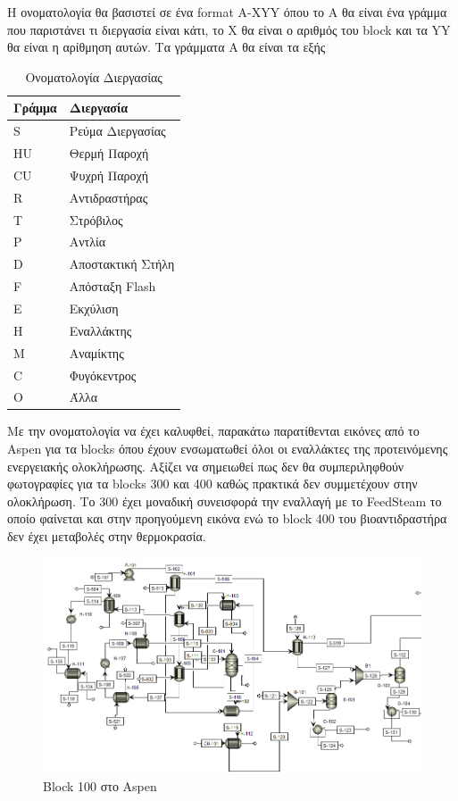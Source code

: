 \documentclass[11pt]{article}
\begin{document}
Η ονοματολογία θα βασιστεί σε ένα format A-XYY όπου το A θα είναι ένα γράμμα που παριστάνει τι διεργασία είναι κάτι, το X θα είναι ο αριθμός του block και τα YY θα είναι η αρίθμηση αυτών. Τα γράμματα Α θα είναι τα εξής

\begin{table}[htbp]
\caption{Ονοματολογία Διεργασίας}
\centering
\begin{tabular}{ll}
Γράμμα & Διεργασία\\
\hline
S & Ρεύμα Διεργασίας\\
HU & Θερμή Παροχή\\
CU & Ψυχρή Παροχή\\
R & Αντιδραστήρας\\
Τ & Στρόβιλος\\
P & Αντλία\\
D & Αποστακτική Στήλη\\
F & Απόσταξη Flash\\
Ε & Εκχύλιση\\
Η & Εναλλάκτης\\
M & Αναμίκτης\\
C & Φυγόκεντρος\\
O & Άλλα\\
\end{tabular}
\end{table}

Με την ονοματολογία να έχει καλυφθεί, παρακάτω παρατίθενται εικόνες από το Aspen για τα blocks όπου έχουν ενσωματωθεί όλοι οι εναλλάκτες της προτεινόμενης ενεργειακής ολοκλήρωσης. Αξίζει να σημειωθεί πως δεν θα συμπεριληφθούν φωτογραφίες για τα blocks 300 και 400 καθώς πρακτικά δεν συμμετέχουν στην ολοκλήρωση. Το 300 έχει μοναδική συνεισφορά την εναλλαγή με το FeedSteam το οποίο φαίνεται και στην προηγούμενη εικόνα ενώ το block 400 του βιοαντιδραστήρα δεν έχει μεταβολές στην θερμοκρασία.

\begin{figure}[htbp]
\centering
\includegraphics[width=.9\linewidth]{Blocks_της_διεργασίας_μετά_την_ενεργειακή_ολοκλήρωση/2023-04-27_14-47-13_screenshot.png}
\caption{Block 100 στο Aspen}
\end{figure}
\end{document}

